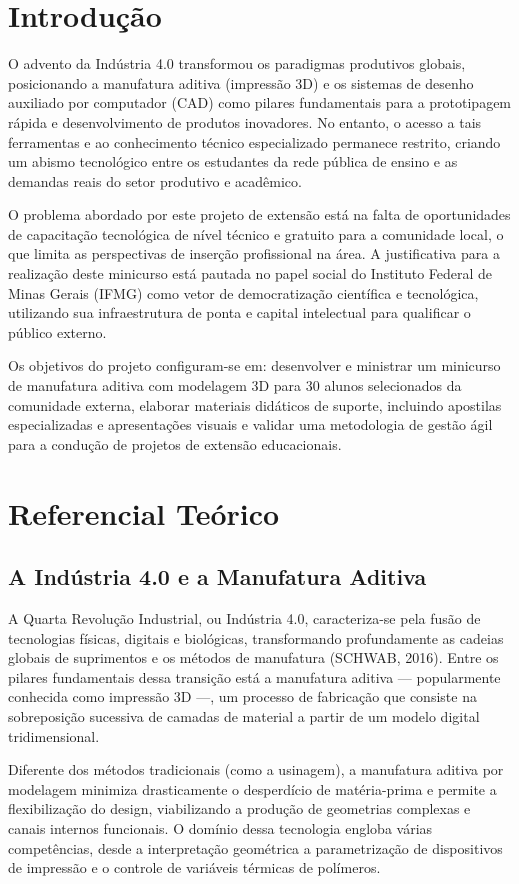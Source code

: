 \documentclass[12pt,a4paper]{article}
\begin{document}
\section{Introdução}
O advento da Indústria 4.0 transformou os paradigmas produtivos globais, posicionando a manufatura aditiva (impressão 3D) e os sistemas de desenho auxiliado por computador (CAD) como pilares fundamentais para a prototipagem rápida e desenvolvimento de produtos inovadores. No entanto, o acesso a tais ferramentas e ao conhecimento técnico especializado permanece restrito, criando um abismo tecnológico entre os estudantes da rede pública de ensino e as demandas reais do setor produtivo e acadêmico.

O problema abordado por este projeto de extensão está na falta de oportunidades de capacitação tecnológica de nível técnico e gratuito para a comunidade local, o que limita as perspectivas de inserção profissional na área. A justificativa para a realização deste minicurso está pautada no papel social do Instituto Federal de Minas Gerais (IFMG) como vetor de democratização científica e tecnológica, utilizando sua infraestrutura de ponta e capital intelectual para qualificar o público externo.

Os objetivos do projeto configuram-se em: desenvolver e ministrar um minicurso de manufatura aditiva com modelagem 3D para 30 alunos selecionados da comunidade externa, elaborar materiais didáticos de suporte, incluindo apostilas especializadas e apresentações visuais e validar uma metodologia de gestão ágil para a condução de projetos de extensão educacionais.

\section{Referencial Teórico}
\subsection{A Indústria 4.0 e a Manufatura Aditiva}
A Quarta Revolução Industrial, ou Indústria 4.0, caracteriza-se pela fusão de tecnologias físicas, digitais e biológicas, transformando profundamente as cadeias globais de suprimentos e os métodos de manufatura (SCHWAB, 2016). Entre os pilares fundamentais dessa transição está a manufatura aditiva — popularmente conhecida como impressão 3D —, um processo de fabricação que consiste na sobreposição sucessiva de camadas de material a partir de um modelo digital tridimensional.

Diferente dos métodos tradicionais (como a usinagem), a manufatura aditiva por modelagem minimiza drasticamente o desperdício de matéria-prima e permite a flexibilização do design, viabilizando a produção de geometrias complexas e canais internos funcionais. O domínio dessa tecnologia engloba várias competências, desde a interpretação geométrica a parametrização de dispositivos de impressão e o controle de variáveis térmicas de polímeros.
\end{document}
